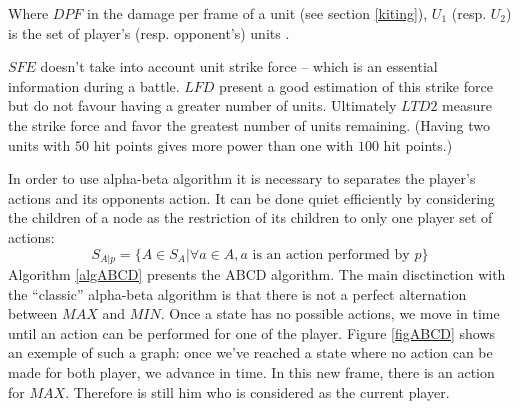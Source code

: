 Where $DPF$ in the damage per frame of a unit (see section \ref{kiting}), $U_1$ (resp. $U_2$) is the set of player's (resp. opponent's) units .

$SFE$ doesn't take into account unit strike force -- which is an essential information during a battle. 
$LFD$ present a good estimation of this strike force but do not favour having a greater number of units. 
Ultimately $LTD2$ measure the strike force and favor the greatest number of units remaining. 
(Having two units with $50$ hit points gives more power than one with $100$ hit points.)

In order to use alpha-beta algorithm it is necessary to separates the player's actions and its opponents action.
It can be done quiet efficiently by considering the children of a node as the restriction of its children to only one player set of actions:
$$
S_{A|p} = \{A \in S_A | \forall a \in A, a \text{ is an action performed by $p$}\}
$$
Algorithm \ref{algABCD} presents the ABCD algorithm.
The main disctinction with the ``classic'' alpha-beta algorithm is that there is not a perfect alternation between $MAX$ and $MIN$. Once a state has no possible actions, we move in time until an action can be performed for one of the player. 
Figure \ref{figABCD} shows an exemple of such a graph: once we've reached a state where no action can be made for both player, we advance in time. In this new frame, there is an action for $MAX$. Therefore is still him who is considered as the current player.

